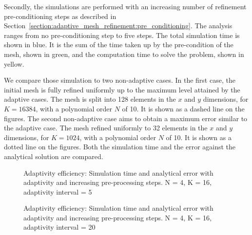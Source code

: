 Secondly, the simulations are performed with an increasing number of refinement pre-conditioning
steps as described in Section~\ref{section:adaptive_mesh_refinement:pre_conditioning}. The analysis
ranges from no pre-conditioning step to five steps. The total simulation time is shown in blue. It
is the sum of the time taken up by the pre-condition of the mesh, shown in green, and the
computation time to solve the problem, shown in yellow. 

We compare those simulation to two non-adaptive cases. In the first case, the initial mesh is fully
refined uniformly up to the maximum level attained by the adaptive cases. The mesh is split into 128
elements in the \(x\) and \(y\) dimensions, for  \(K = 16384\), with a polynomial order  \(N\) of
10. It is shown as a dashed line on the figures. The second non-adaptive case aims to obtain a
maximum error similar to the adaptive case. The mesh refined uniformly to 32 elements in the \(x\)
and \(y\) dimensions, for  \(K = 1024\), with a polynomial order  \(N\) of 10. It is shown as a
dotted line on the figures. Both the simulation time and the error against the analytical solution
are compared.


\begin{figure}[H]
	\centering
	\caption{Adaptivity efficiency: Simulation time and analytical error with adaptivity and increasing pre-processing steps. N = 4, K = 16, adaptivity interval = 5}\label{fig:adaptivity_efficiency_C5}
\end{figure}

\begin{figure}[H]
	\centering
	\hfill
	\caption{Adaptivity efficiency: Simulation time and analytical error with adaptivity and increasing pre-processing steps. N = 4, K = 16, adaptivity interval = 20}\label{fig:adaptivity_efficiency_C20}
\end{figure}

